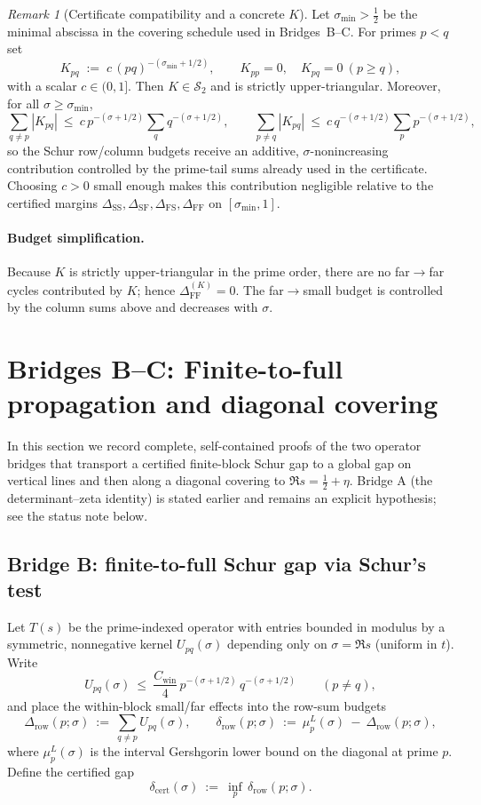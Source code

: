 \documentclass[11pt]{article}
\theoremstyle{definition}
\theoremstyle{remark}
\newtheorem{remark}[theorem]{Remark}
\newcommand{\HS}{\mathcal{S}_2}
\begin{document}
\begin{remark}[Certificate compatibility and a concrete $K$]\label{rem:K-choice}
Let $\sigma_{\min}>\tfrac12$ be the minimal abscissa in the covering schedule used in Bridges~B--C. For primes $p<q$ set
\[
  K_{pq}\;:=\;c\,(pq)^{-(\sigma_{\min}+1/2)},\qquad K_{pp}=0,\quad K_{pq}=0\ (p\ge q),
\]
with a scalar $c\in(0,1]$. Then $K\in\HS$ and is strictly upper-triangular. Moreover, for all $\sigma\ge\sigma_{\min}$,
\[
  \sum_{q\ne p} |K_{pq}|\ \le\ c\,p^{-(\sigma+1/2)}\sum_{q} q^{-(\sigma+1/2)},\qquad
  \sum_{p\ne q} |K_{pq}|\ \le\ c\,q^{-(\sigma+1/2)}\sum_{p} p^{-(\sigma+1/2)},
\]
so the Schur row/column budgets receive an additive, $\sigma$-nonincreasing contribution controlled by the prime-tail sums already used in the certificate. Choosing $c>0$ small enough makes this contribution negligible relative to the certified margins $\Delta_{\mathrm{SS}},\Delta_{\mathrm{SF}},\Delta_{\mathrm{FS}},\Delta_{\mathrm{FF}}$ on $[\sigma_{\min},1]$.
\end{remark}

\paragraph{Budget simplification.}
Because $K$ is strictly upper-triangular in the prime order, there are no far$\to$far cycles contributed by $K$; hence $\Delta_{\mathrm{FF}}^{(K)}=0$. The far$\to$small budget is controlled by the column sums above and decreases with $\sigma$.

\section{Bridges B--C: Finite-to-full propagation and diagonal covering}

In this section we record complete, self-contained proofs of the two operator bridges that transport a certified finite-block Schur gap to a global gap on vertical lines and then along a diagonal covering to $\Re s=\tfrac12+\eta$. Bridge A (the determinant--zeta identity) is stated earlier and remains an explicit hypothesis; see the status note below.

\subsection*{Bridge B: finite-to-full Schur gap via Schur's test}

Let $T(s)$ be the prime-indexed operator with entries bounded in modulus by a symmetric, nonnegative kernel $U_{pq}(\sigma)$ depending only on $\sigma=\Re s$ (uniform in $t$). Write
\[
  U_{pq}(\sigma)\ \le\ \frac{C_{\mathrm{win}}}{4}\,p^{-(\sigma+1/2)}\,q^{-(\sigma+1/2)}\qquad(p\ne q),
\]
and place the within-block small/far effects into the row-sum budgets
\[
  \Delta_{\mathrm{row}}(p;\sigma)\ :=\ \sum_{q\ne p} U_{pq}(\sigma),\qquad
  \delta_{\mathrm{row}}(p;\sigma)\ :=\ \mu_p^L(\sigma)\ -\ \Delta_{\mathrm{row}}(p;\sigma),
\]
where $\mu_p^L(\sigma)$ is the interval Gershgorin lower bound on the diagonal at prime $p$. Define the certified gap
\[
  \delta_{\mathrm{cert}}(\sigma)\ :=\ \inf_{p}\,\delta_{\mathrm{row}}(p;\sigma).
\]
\end{document}
